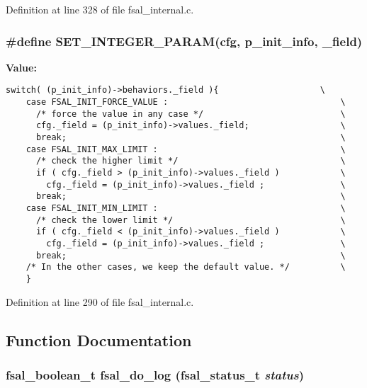 Definition at line 328 of file fsal\_\-internal.c.
\subsubsection{\setlength{\rightskip}{0pt plus 5cm}\#define SET\_\-INTEGER\_\-PARAM(cfg, p\_\-init\_\-info, \_\-field)}\label{fsal__internal_8c_a1}


{\bf Value:}

\footnotesize\begin{verbatim}switch( (p_init_info)->behaviors._field ){                    \
    case FSAL_INIT_FORCE_VALUE :                                  \
      /* force the value in any case */                           \
      cfg._field = (p_init_info)->values._field;                  \
      break;                                                      \
    case FSAL_INIT_MAX_LIMIT :                                    \
      /* check the higher limit */                                \
      if ( cfg._field > (p_init_info)->values._field )            \
        cfg._field = (p_init_info)->values._field ;               \
      break;                                                      \
    case FSAL_INIT_MIN_LIMIT :                                    \
      /* check the lower limit */                                 \
      if ( cfg._field < (p_init_info)->values._field )            \
        cfg._field = (p_init_info)->values._field ;               \
      break;                                                      \
    /* In the other cases, we keep the default value. */          \
    }
\end{verbatim}\normalsize 


Definition at line 290 of file fsal\_\-internal.c.

\subsection{Function Documentation}
\subsubsection{\setlength{\rightskip}{0pt plus 5cm}fsal\_\-boolean\_\-t fsal\_\-do\_\-log (fsal\_\-status\_\-t {\em status})}\label{fsal__internal_8c_a21}


